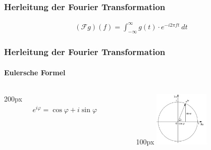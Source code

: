 \begin{frame}
    \frametitle{Herleitung der Fourier Transformation} 

    \begin{align*}
        (\mathcal{F} g)(f)=\int_{-\infty}^{\infty}{g(t)\cdot e^{-i2\pi f t}\ dt}
    \end{align*}
\end{frame}

\begin{frame}
    \frametitle{Herleitung der Fourier Transformation}
    \framesubtitle{Eulersche Formel}

    \hspace{-100px}
    \begin{columns}[c]
        \begin{column}{200px}
        \begin{align*}
        e^{i\varphi}=\cos{\varphi}+i\sin{\varphi}
    \end{align*}
\end{column}
\hspace*{-60px}
\begin{column}{100px}
    \includegraphics[width=100px]{images/02-deriving-fourier-euler.png}
\end{column}
    \end{columns}
\end{frame}

